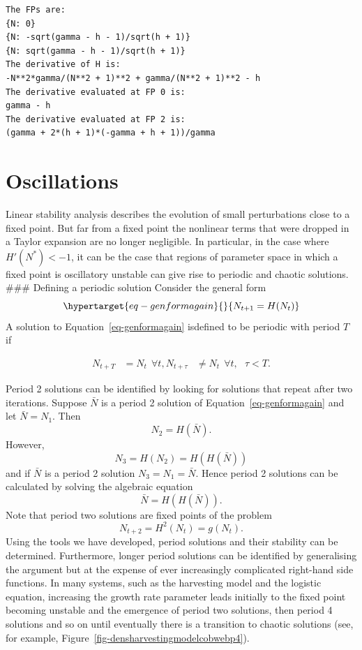 \documentclass[
  letterpaper,
  DIV=11,
  numbers=noendperiod]{scrreprt}
\begin{document}
\hypertarget{code-calc1harvesting}{}
\begin{verbatim}
The FPs are:
{N: 0}
{N: -sqrt(gamma - h - 1)/sqrt(h + 1)}
{N: sqrt(gamma - h - 1)/sqrt(h + 1)}
The derivative of H is:
-N**2*gamma/(N**2 + 1)**2 + gamma/(N**2 + 1)**2 - h
The derivative evaluated at FP 0 is:
gamma - h
The derivative evaluated at FP 2 is:
(gamma + 2*(h + 1)*(-gamma + h + 1))/gamma
\end{verbatim}

\hypertarget{oscillations}{%
\section{Oscillations}\label{oscillations}}

Linear stability analysis describes the evolution of small perturbations
close to a fixed point. But far from a fixed point the nonlinear terms
that were dropped in a Taylor expansion are no longer negligible. In
particular, in the case where \(H'(N^*)<-1\), it can be the case that
regions of parameter space in which a fixed point is oscillatory
unstable can give rise to periodic and chaotic solutions.\\
\#\#\# Defining a periodic solution Consider the general form
\begin{equation}\protect\hypertarget{eq-genformagain}{}{
N_{t+1}=H(N_t)
}\label{eq-genformagain}\end{equation} A solution to
Equation~\ref{eq-genformagain} isdefined to be periodic with period
\(T\) if

\[
\begin{aligned}
N_{t+T}&=N_t \ \  \forall t, 
N_{t+\tau}&\neq N_t  \ \ \forall t, \  \ \ \tau<T.
\end{aligned}
\]

Period 2 solutions can be identified by looking for solutions that
repeat after two iterations. Suppose \(\bar{N}\) is a period 2 solution
of Equation~\ref{eq-genformagain} and let \(\bar{N}=N_1\). Then \[
N_{2}=H(\bar{N}).
\] However, \[
N_{3}=H(N_2)=H(H(\bar{N}))
\] and if \(\bar{N}\) is a period 2 solution \(N_3=N_1=\bar{N}\). Hence
period 2 solutions can be calculated by solving the algebraic equation
\[
\bar{N}=H(H(\bar{N})).
\] Note that period two solutions are fixed points of the problem \[
N_{t+2}=H^2(N_t)=g(N_t).
\] Using the tools we have developed, period solutions and their
stability can be determined. Furthermore, longer period solutions can be
identified by generalising the argument but at the expense of ever
increasingly complicated right-hand side functions. In many systems,
such as the harvesting model and the logistic equation, increasing the
growth rate parameter leads initially to the fixed point becoming
unstable and the emergence of period two solutions, then period 4
solutions and so on until eventually there is a transition to chaotic
solutions (see, for example,
Figure~\ref{fig-densharvestingmodelcobwebp4}).
\end{document}
